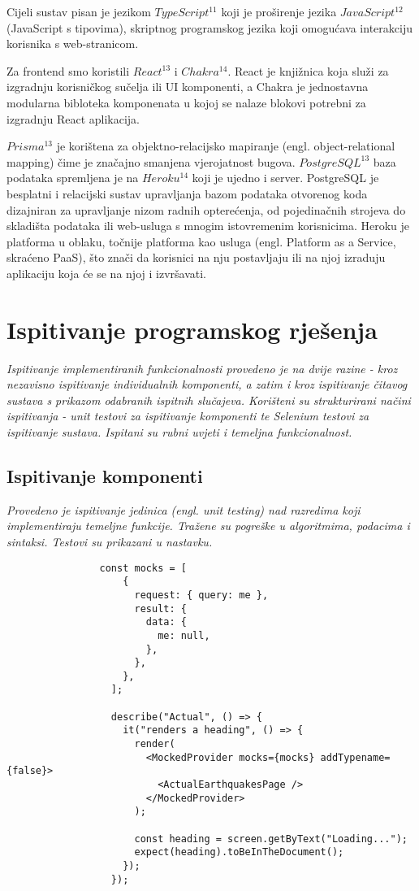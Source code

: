 		Cijeli sustav pisan je jezikom $TypeScript^{11}$ koji je proširenje jezika $JavaScript^{12}$ (JavaScript s tipovima), skriptnog programskog jezika koji omogućava interakciju korisnika s web-stranicom.
		
		Za frontend smo koristili $React^{13}$ i $Chakra^{14}$. React je knjižnica koja služi za izgradnju korisničkog sučelja ili UI komponenti, a Chakra je jednostavna modularna bibloteka komponenata	u kojoj se nalaze blokovi potrebni za izgradnju React aplikacija.
		
		$Prisma^{13}$ je korištena za objektno-relacijsko mapiranje (engl. object-relational mapping) čime je	značajno smanjena vjerojatnost bugova. $PostgreSQL^{13}$ baza podataka spremljena je na $Heroku^{14}$	koji je ujedno i server. PostgreSQL je besplatni i relacijski sustav upravljanja bazom podataka otvorenog koda dizajniran za upravljanje nizom radnih opterećenja, od pojedinačnih strojeva do skladišta podataka ili web-usluga s mnogim istovremenim korisnicima. Heroku je platforma u oblaku, točnije platforma kao usluga (engl. Platform as a Service, skraćeno PaaS), što znači da korisnici	na nju postavljaju ili na njoj izraduju aplikaciju koja će se na njoj i izvršavati.
		
			\eject 
		
	
		\section{Ispitivanje programskog rješenja}
			
			 \textit{Ispitivanje implementiranih funkcionalnosti provedeno je na dvije razine - kroz nezavisno ispitivanje individualnih komponenti, a zatim i kroz ispitivanje čitavog sustava s prikazom odabranih ispitnih slučajeva. Korišteni su strukturirani načini ispitivanja - unit testovi za ispitivanje komponenti te Selenium testovi za ispitivanje sustava. Ispitani su rubni uvjeti i temeljna funkcionalnost.}
			
			\subsection{Ispitivanje komponenti}
			\textit{Provedeno je ispitivanje jedinica (engl. unit testing) nad razredima koji implementiraju temeljne funkcije. Tražene su pogreške u algoritmima, podacima i sintaksi. Testovi su prikazani u nastavku.}
			
			\noindent {}
			\begin{lstlisting}
				const mocks = [
					{
					  request: { query: me },
					  result: {
						data: {
						  me: null,
						},
					  },
					},
				  ];
				  
				  describe("Actual", () => {
					it("renders a heading", () => {
					  render(
						<MockedProvider mocks={mocks} addTypename={false}>
						  <ActualEarthquakesPage />
						</MockedProvider>
					  );
				  
					  const heading = screen.getByText("Loading...");
					  expect(heading).toBeInTheDocument();
					});
				  });
			\end{lstlisting}

